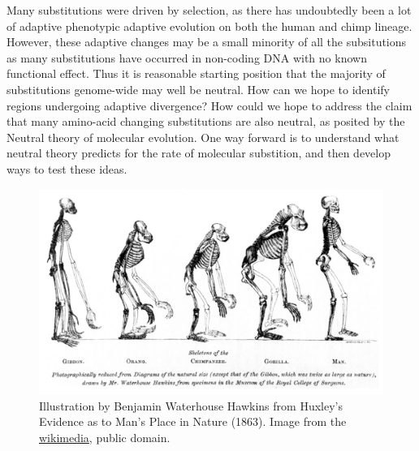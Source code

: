 
Many substitutions were driven by selection, as there has undoubtedly
been a lot of adaptive phenotypic adaptive evolution on both the human
and chimp lineage. However, these adaptive changes may be a small
minority of all the subsitutions as many substitutions have occurred in
non-coding DNA with no known functional effect. Thus it is reasonable
starting position that the majority of substitutions genome-wide may well be
neutral. 
How can we hope to identify regions undergoing adaptive divergence?
How could we hope to address the claim that many amino-acid changing
substitutions are also neutral, as posited by the Neutral theory of
molecular evolution. One way forward is to understand what neutral theory predicts for the
rate of molecular substition, and then develop ways to test
these ideas.

\begin{figure}
\begin{center}
  \includegraphics[width = \textwidth]{illustration_images/Genetic_drift/Huxley_mans_place/Huxley_Mans_Place_in_Nature.jpg}
\end{center}
\caption{Illustration by Benjamin Waterhouse Hawkins from Huxley's
  Evidence as to Man's Place in Nature (1863).
\newline \noindent \tiny{Image from the
  \href{https://en.wikipedia.org/wiki/Pithecometra_principle\#/media/File:Huxley_-_Mans_Place_in_Nature.jpg}{wikimedia},
   public domain.} 
} \label{fig:Huxley_man}
\end{figure}


